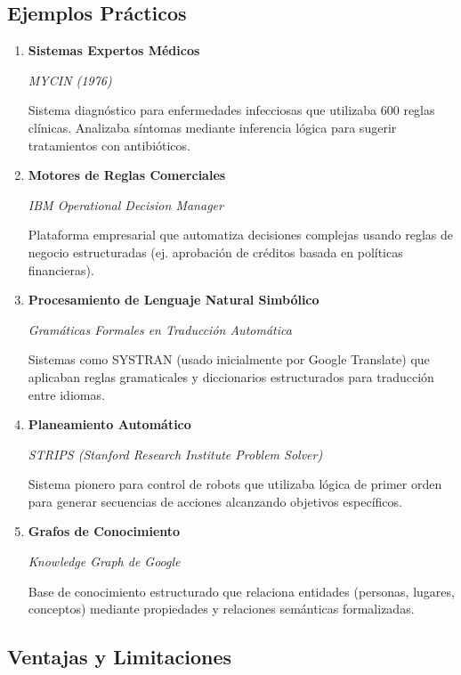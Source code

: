 \documentclass[14pt]{extarticle}
\begin{document}
  \subsection*{Ejemplos Prácticos}
  \begin{enumerate}
    \item \textbf{Sistemas Expertos Médicos}
    
      \textit{MYCIN (1976)}
    
      Sistema diagnóstico para enfermedades infecciosas que utilizaba 600 reglas clínicas. Analizaba síntomas mediante inferencia lógica para sugerir tratamientos con antibióticos.

    \item \textbf{Motores de Reglas Comerciales}
    
      \textit{IBM Operational Decision Manager}
      
      Plataforma empresarial que automatiza decisiones complejas usando reglas de negocio estructuradas (ej. aprobación de créditos basada en políticas financieras).

    \item \textbf{Procesamiento de Lenguaje Natural Simbólico}
    
      \textit{Gramáticas Formales en Traducción Automática}
      
      Sistemas como SYSTRAN (usado inicialmente por Google Translate) que aplicaban reglas gramaticales y diccionarios estructurados para traducción entre idiomas.

    \item \textbf{Planeamiento Automático}
    
      \textit{STRIPS (Stanford Research Institute Problem Solver)}

      Sistema pionero para control de robots que utilizaba lógica de primer orden para generar secuencias de acciones alcanzando objetivos específicos.

    \item \textbf{Grafos de Conocimiento}
    
      \textit{Knowledge Graph de Google}

      Base de conocimiento estructurado que relaciona entidades (personas, lugares, conceptos) mediante propiedades y relaciones semánticas formalizadas.
  \end{enumerate}

  \subsection*{Ventajas y Limitaciones}
\end{document}
